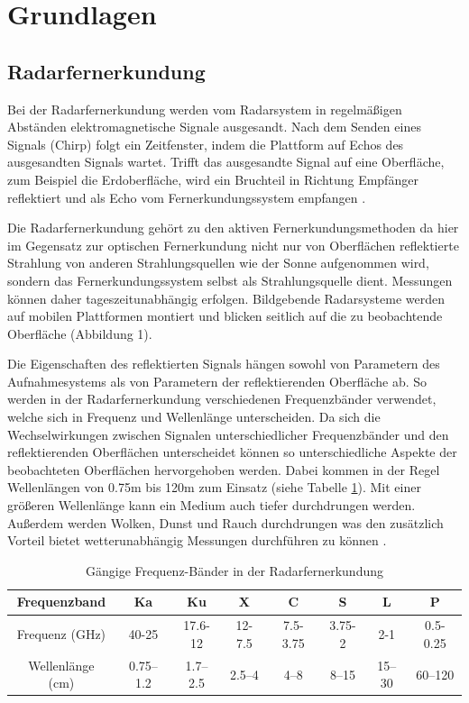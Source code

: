 \newpage
\restoregeometry
\section{Grundlagen}
\subsection{Radarfernerkundung}
Bei der Radarfernerkundung werden vom Radarsystem in regelmäßigen Abständen elektromagnetische Signale ausgesandt. Nach dem Senden eines Signals 
(Chirp) folgt ein Zeitfenster, indem die Plattform auf Echos des ausgesandten Signals wartet.
Trifft das ausgesandte Signal auf eine Oberfläche, zum Beispiel 
die Erdoberfläche, wird ein Bruchteil in Richtung Empfänger reflektiert und als Echo vom Fernerkundungssystem empfangen \cite{tutorial_on_sar}.

Die Radarfernerkundung gehört zu den aktiven Fernerkundungsmethoden da hier im Gegensatz zur optischen Fernerkundung nicht nur 
von Oberflächen reflektierte Strahlung von anderen Strahlungsquellen wie der Sonne aufgenommen wird, sondern das Fernerkundungssystem 
selbst als Strahlungsquelle dient. Messungen können daher tageszeitunabhängig erfolgen. Bildgebende Radarsysteme werden auf mobilen Plattformen 
montiert und blicken seitlich auf die zu beobachtende Oberfläche \cite{tutorial_on_sar} (Abbildung 1). 

Die Eigenschaften des reflektierten Signals hängen sowohl von Parametern des Aufnahmesystems als von Parametern der reflektierenden Oberfläche ab.
So werden in der Radarfernerkundung verschiedenen Frequenzbänder verwendet, welche sich in Frequenz und Wellenlänge unterscheiden. Da sich die Wechselwirkungen zwischen Signalen 
unterschiedlicher Frequenzbänder und den reflektierenden Oberflächen unterscheidet können so unterschiedliche Aspekte der beobachteten Oberflächen hervorgehoben werden. 
Dabei kommen in der Regel Wellenlängen von 0.75m bis 120m zum Einsatz (siehe Tabelle \ref{frequenzbaender}).
Mit einer größeren Wellenlänge kann ein Medium auch tiefer durchdrungen werden. 
Außerdem werden Wolken, Dunst und Rauch durchdrungen was den zusätzlich Vorteil bietet wetterunabhängig Messungen durchführen zu können \cite{einfuehrung_in_fernerkundung}.

\begin{table}[H]
    \caption{Gängige Frequenz-Bänder in der Radarfernerkundung \cite{tutorial_on_sar}}
    \centering
    \begin{tabular}{c|c c c c c c c } 
        Frequenzband & Ka & Ku & X & C & S & L & P\\ 
        \hline
        Frequenz (GHz) & 40-25 & 17.6-12 & 12-7.5 & 7.5-3.75 & 3.75-2 & 2-1 & 0.5-0.25\\ 
        Wellenlänge (cm) & 0.75–1.2 & 1.7–2.5 & 2.5–4 & 4–8 & 8–15 & 15–30 & 60–120\\ 
    \end{tabular}
    \label{frequenzbaender}
\end{table}

